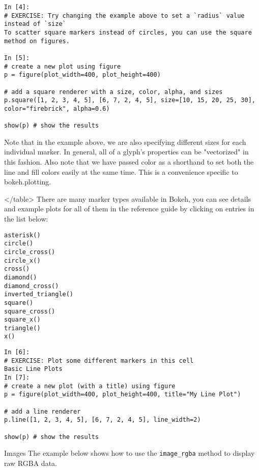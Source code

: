\begin{framed}
\begin{verbatim}
In [4]:
# EXERCISE: Try changing the example above to set a `radius` value instead of `size`
To scatter square markers instead of circles, you can use the square method on figures.

In [5]:
# create a new plot using figure
p = figure(plot_width=400, plot_height=400)

# add a square renderer with a size, color, alpha, and sizes
p.square([1, 2, 3, 4, 5], [6, 7, 2, 4, 5], size=[10, 15, 20, 25, 30], color="firebrick", alpha=0.6)

show(p) # show the results
\end{verbatim}
\end{framed}
Note that in the example above, we are also specifying different sizes for each individual marker. In general, all of a glyph's properties can be "vectorized" in this fashion. Also note that we have passed color as a shorthand to set both the line and fill colors easily at the same time. This is a convenience specific to bokeh.plotting.

</table>
There are many marker types available in Bokeh, you can see details and example plots for all of them in the reference guide by clicking on entries in the list below:
\begin{framed}
\begin{verbatim}
asterisk()
circle()
circle_cross()
circle_x()
cross()
diamond()
diamond_cross()
inverted_triangle()
square()
square_cross()
square_x()
triangle()
x()
\end{verbatim}
\end{framed}
\begin{framed}
	\begin{verbatim}
In [6]:
# EXERCISE: Plot some different markers in this cell
Basic Line Plots
In [7]:
# create a new plot (with a title) using figure
p = figure(plot_width=400, plot_height=400, title="My Line Plot")

# add a line renderer
p.line([1, 2, 3, 4, 5], [6, 7, 2, 4, 5], line_width=2)

show(p) # show the results
\end{verbatim}
\end{framed}
Images
The example below shows how to use the \texttt{image\_rgba} method to display raw RGBA data.


